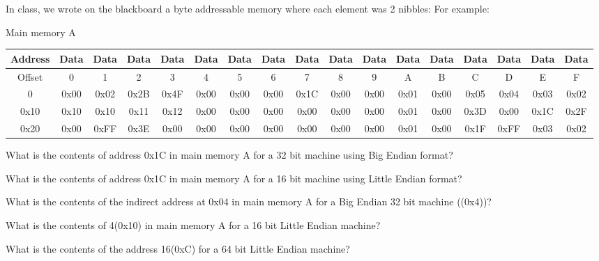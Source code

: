\documentclass[12pt]{report}
\begin{document}
\noindent

In class, we wrote on the blackboard a byte addressable memory where each element was 2 nibbles:
For example:
\newline

Main memory A
\tiny
\begin{center}
\begin{tabular}{ |c||c|c|c|c|c|c|c|c|c|c|c|c|c|c|c|c| }\hline
Address & Data & Data & Data & Data & Data & Data & Data & Data & Data & Data & Data & Data & Data & Data & Data & Data \\ \hline
Offset  &  0 & 1 & 2 & 3 & 4 & 5 & 6 & 7 & 8 & 9 & A & B & C & D & E & F \\ \hline
0  &  0x00 & 0x02 & 0x2B & 0x4F & 0x00 & 0x00 &0x00 &0x1C & 0x00 & 0x00 & 0x01 & 0x00 & 0x05 & 0x04 & 0x03 & 0x02 \\ \hline
0x10  & 0x10 & 0x10 & 0x11 & 0x12 & 0x00 & 0x00 &0x00 &0x00 & 0x00 & 0x00 & 0x01 & 0x00 & 0x3D & 0x00 & 0x1C & 0x2F \\ \hline
0x20  & 0x00 & 0xFF & 0x3E & 0x00 & 0x00 & 0x00 &0x00 &0x00 & 0x00 & 0x00 & 0x01 & 0x00 & 0x1F & 0xFF & 0x03 & 0x02 \\ \hline
\hline
\end{tabular}
\end{center}

\normalsize
\normalsize

What is the contents of address 0x1C in main memory A for a 32 bit machine
using Big Endian format?
\newline
\newline

What is the contents of address 0x1C in main memory A for a 16 bit machine
using Little Endian format?
\newline
\newline

What is the contents of the indirect address at 0x04 in main memory A for a Big Endian 32 bit machine ((0x4))? 
\newline
\newline

What is the contents of 4(0x10) in main memory A for a 16 bit Little Endian machine?  
\newline
\newline

What is the contents of the address 16(0xC) for  a 64 bit Little Endian machine?
\end{document}
